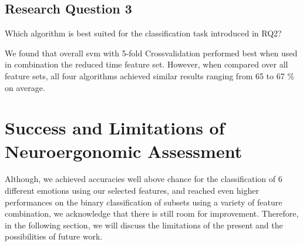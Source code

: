\subsection{Research Question 3}  
Which algorithm is best suited for the classification task introduced in RQ2?

We found that overall \gls{svm} with 5-fold Crossvalidation performed best when used in combination the reduced time feature set. However, when compared over all feature sets, all four algorithms achieved similar results ranging from 65 to 67 \% on average.

\section{Success and Limitations of Neuroergonomic Assessment}
Although, we achieved accuracies well above chance for the classification of 6 different emotions using our selected features, and reached even higher performances on the binary classification of subsets using a variety of feature combination, we acknowledge that there is still room for improvement. Therefore, in the following section, we will discuss the limitations of the present and the possibilities of future work.

